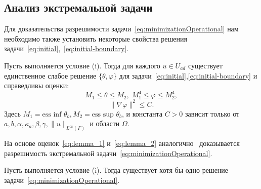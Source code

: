 \subsection{Анализ экстремальной задачи} \label{subsec:optimality}

Для доказательства разрешимости задачи~\eqref{eq:minimizationOperational}
нам необходимо также установить некоторые свойства решения задачи~\eqref{eq:initial},~\eqref{eq:initial-boundary}.

\begin{lem}
    \label{SolvabilityLemma}
    Пусть выполняется условие (i).
    Тогда для каждого $ u \in U_{ad} $ существует единственное слабое решение
    $\{\theta, \varphi \}$ для задачи~\eqref{eq:initial},\eqref{eq:initial-boundary} и справедливы оценки:
    \begin{equation}
        \label{eq:lemma_1}
        M_1 \le \theta \le M_2, \; M_1^4 \le \varphi \le M_2^4,
    \end{equation}
    \begin{equation}
        \label{eq:lemma_2}
        \| \nabla \varphi \|^2 \le C.
    \end{equation}
    Здесь $M_1 = \text{ess inf } \theta_b, M_2 = \text{ess sup } \theta_b$, и константа $C > 0$ зависит
    только от \\ $a, b, \alpha, \kappa_a, \beta, \gamma, \|u\|_{L^\infty(\Gamma)}$ и области $\Omega$.
\end{lem}

На основе оценок~\eqref{eq:lemma_1} и~\eqref{eq:lemma_2} аналогично~\cite{cheb_origin}
доказывается разрешимость экстремальной задачи~\eqref{eq:minimizationOperational}.
\begin{thm}
    Пусть выполняется условие (i).
    Тогда существует хотя бы одно решение задачи~\eqref{eq:minimizationOperational}.
\end{thm}



